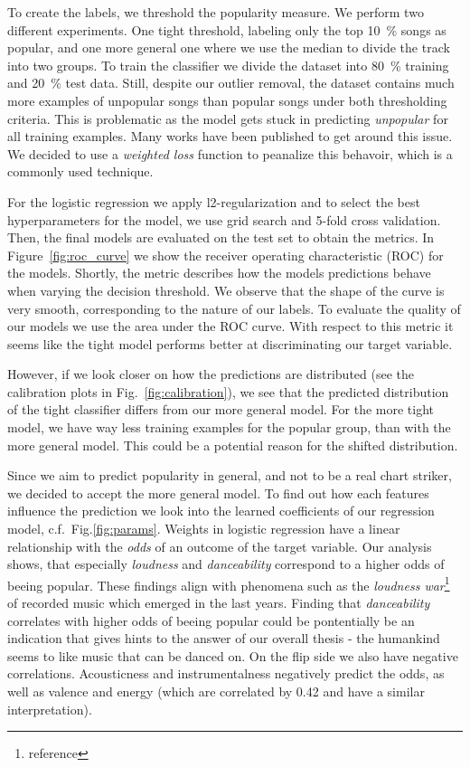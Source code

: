 \documentclass{article}
\begin{document}
To create the labels, we threshold the popularity measure. 
We perform two different experiments. 
One tight threshold, labeling only the top \SI{10}{\percent} songs as popular, and one more general one where we use the median to divide the track into two groups.
To train the classifier we divide the dataset into \SI{80}{\percent} training and \SI{20}{\percent} test data.
Still, despite our outlier removal, the dataset contains much more examples of unpopular songs than popular songs under both thresholding criteria.
This is problematic as the model gets stuck in predicting \textit{unpopular} for all training examples. 
Many works have been published to get around this issue. We decided to use a \textit{weighted loss} function to peanalize this behavoir, which is a commonly used technique. %

For the logistic regression we apply l2-regularization and to select the best hyperparameters for the model, we use grid search and 5-fold cross validation. Then, the final models are evaluated on the test set to obtain the metrics.
In Figure~\ref{fig:roc_curve} we show the  receiver operating characteristic (ROC) for the models.
Shortly, the metric describes how the models predictions behave when varying the decision threshold. 
We observe that the shape of the curve is very smooth, corresponding to the nature of our labels.
To evaluate the quality of our models we use the area under the ROC curve.
With respect to this metric it seems like the tight model performs better at discriminating our target variable.

However, if we look closer on how the predictions are distributed (see the calibration plots in Fig.~\ref{fig:calibration}), we see that the predicted distribution of the tight classifier differs from our more general model.
For the more tight model, we have way less training examples for the popular group, than with the more general model. This could be a potential reason for the shifted distribution.

Since we aim to predict popularity in general, and not to be a real chart striker, we decided to accept the more general model.
To find out how each features influence the prediction we look into the learned coefficients of our regression model, c.f.~Fig.\ref{fig:params}.
Weights in logistic regression have a linear relationship with the \textit{odds} of an outcome of the target variable.
Our analysis shows, that especially \textit{loudness} and \textit{danceability} correspond to a higher odds of beeing popular.
These findings align with phenomena such as the \textit{loudness war}\footnote{reference} of recorded music which emerged in the last years.
Finding that \textit{danceability} correlates with higher odds of beeing popular could be pontentially be an indication that gives hints to the answer of our overall thesis - the humankind seems to like music that can be danced on.
On the flip side we also have negative correlations. 
Acousticness and instrumentalness negatively predict the odds, as well as valence and energy (which are correlated by 0.42 and have a similar interpretation).
\end{document}
